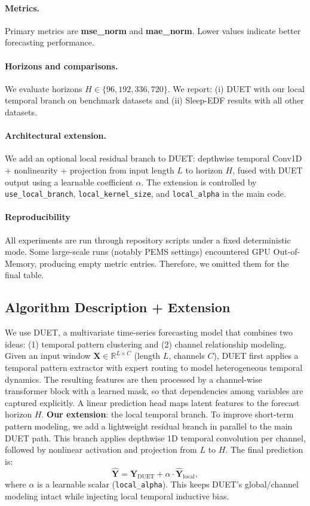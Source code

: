 \documentclass[conference]{IEEEtran}
\begin{document}
\paragraph{Metrics.}
Primary metrics are \textbf{mse\_norm} and \textbf{mae\_norm}.  
Lower values indicate better forecasting performance.

\paragraph{Horizons and comparisons.}
We evaluate horizons $H\in\{96,192,336,720\}$.  
We report:
(i) DUET with our local temporal branch on benchmark datasets and 
(ii) Sleep-EDF results with all other datasets.
\paragraph{Architectural extension.}
We add an optional local residual branch to DUET:
depthwise temporal Conv1D + nonlinearity + projection from input length $L$ to horizon $H$, fused with DUET output using a learnable coefficient $\alpha$.  
The extension is controlled by \texttt{use\_local\_branch}, \texttt{local\_kernel\_size}, and \texttt{local\_alpha} in the main code.

\paragraph{Reproducibility}
All experiments are run through repository scripts under a fixed deterministic mode. Some large-scale runs (notably PEMS settings) encountered GPU Out-of-Memory, producing empty metric entries. Therefore, we omitted them for the final table. 
\subsection{Algorithm Description + Extension}

We use DUET, a multivariate time-series forecasting model that combines two ideas:
(1) temporal pattern clustering and (2) channel relationship modeling.
Given an input window $\mathbf{X}\in\mathbb{R}^{L\times C}$ (length $L$, channels $C$), DUET first applies a temporal pattern extractor with expert routing to model heterogeneous temporal dynamics. The resulting features are then processed by a channel-wise transformer block with a learned mask, so that dependencies among variables are captured explicitly. A linear prediction head maps latent features to the forecast horizon $H$. \textbf{Our extension}: the local temporal branch. To improve short-term pattern modeling, we add a lightweight residual branch in parallel to the main DUET path. This branch applies depthwise 1D temporal convolution per channel, followed by nonlinear activation and projection from $L$ to $H$. The final prediction is:
\[
\hat{\mathbf{Y}} = \hat{\mathbf{Y}}_{\text{DUET}} + \alpha \cdot \hat{\mathbf{Y}}_{\text{local}},
\]
where $\alpha$ is a learnable scalar (\texttt{local\_alpha}).  
This keeps DUET’s global/channel modeling intact while injecting local temporal inductive bias.
\end{document}
